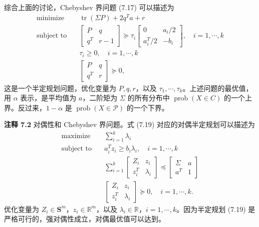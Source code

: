 \documentclass[UTF8,12pt,a4paper,fontset=fandol]{ctexart}
\begin{document}
综合上面的讨论，Chebyshev 界问题 (7.17) 可以描述为
\begin{equation}
\begin{aligned}
\text{minimize}\quad & \operatorname{tr}(\Sigma P)+2q^Ta+r\\
\text{subject to}\quad &
\begin{bmatrix}
P & q\\
q^T & r-1
\end{bmatrix}\succeq
\tau_i
\begin{bmatrix}
0 & a_i/2\\
a_i^T/2 & -b_i
\end{bmatrix},
\quad i=1,\cdots,k\\
& \tau_i\geq 0,\quad i=1,\cdots,k\\
&
\begin{bmatrix}
P & q\\
q^T & r
\end{bmatrix}\succeq 0,
\end{aligned}
\tag{7.19}
\end{equation}
这是一个半定规划问题，优化变量为 $P,q,r$，以及 $\tau_1,\cdots,\tau_k$。上述问题的最优值，用 $\alpha$ 表示，是平均值为 $a$，二阶矩为 $\Sigma$ 的所有分布中 $\operatorname{prob}(X\in C)$ 的一个上界。反过来，$1-\alpha$ 是 $\operatorname{prob}(X\in\mathcal{P})$ 的一个下界。

\noindent\textbf{注释 7.2}\quad
对偶性和 Chebyshev 界问题。式 (7.19) 对应的对偶半定规划可以描述为
\[
\begin{aligned}
\text{maximize}\quad & \sum_{i=1}^k \lambda_i\\
\text{subject to}\quad & a_i^Tz_i\geq b_i\lambda_i,\quad i=1,\cdots,k\\
& \sum_{i=1}^k
\begin{bmatrix}
Z_i & z_i\\
z_i^T & \lambda_i
\end{bmatrix}
\preceq
\begin{bmatrix}
\Sigma & a\\
a^T & 1
\end{bmatrix}\\
&
\begin{bmatrix}
Z_i & z_i\\
z_i^T & \lambda_i
\end{bmatrix}\succeq 0,\quad i=1,\cdots,k.
\end{aligned}
\]
优化变量为 $Z_i\in\mathbf{S}^m$，$z_i\in\mathbb{R}^m$，以及 $\lambda_i\in\mathbb{R}$，$i=1,\cdots,k$。因为半定规划 (7.19) 是严格可行的，强对偶性成立，对偶最优值可以达到。
\end{document}
